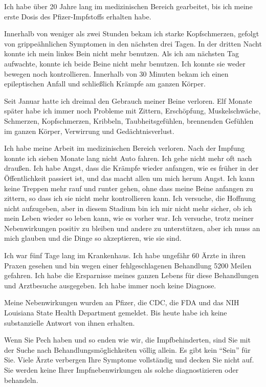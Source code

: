 Ich habe über 20 Jahre lang im medizinischen Bereich gearbeitet, bis ich meine
erste Dosis des Pfizer-Impfstoffs erhalten habe.

Innerhalb von weniger als zwei Stunden bekam ich starke Kopfschmerzen, gefolgt
von grippeähnlichen Symptomen in den nächsten drei Tagen. In der dritten Nacht
konnte ich mein linkes Bein nicht mehr benutzen. Als ich am nächsten Tag
aufwachte, konnte ich beide Beine nicht mehr benutzen. Ich konnte sie weder
bewegen noch kontrollieren. Innerhalb von 30 Minuten bekam ich einen
epileptischen Anfall und schließlich Krämpfe am ganzen Körper.

Seit Januar hatte ich dreimal den Gebrauch meiner Beine verloren. Elf Monate
später habe ich immer noch Probleme mit Zittern, Erschöpfung, Muskelschwäche,
Schmerzen, Kopfschmerzen, Kribbeln, Taubheitsgefühlen, brennenden Gefühlen im
ganzen Körper, Verwirrung und Gedächtnisverlust.

Ich habe meine Arbeit im medizinischen Bereich verloren. Nach der Impfung konnte
ich sieben Monate lang nicht Auto fahren. Ich gehe nicht mehr oft nach
draußen. Ich habe Angst, dass die Krämpfe wieder anfangen, wie es früher in der
Öffentlichkeit passiert ist, und das macht allen um mich herum Angst. Ich kann
keine Treppen mehr rauf und runter gehen, ohne dass meine Beine anfangen zu
zittern, so dass ich sie nicht mehr kontrollieren kann. Ich versuche, die
Hoffnung nicht aufzugeben, aber in diesem Stadium bin ich mir nicht mehr sicher,
ob ich mein Leben wieder so leben kann, wie es vorher war. Ich versuche, trotz
meiner Nebenwirkungen positiv zu bleiben und andere zu unterstützen, aber ich
muss an mich glauben und die Dinge so akzeptieren, wie sie sind.

Ich war fünf Tage lang im Krankenhaus. Ich habe ungefähr 60 Ärzte in ihren
Praxen gesehen und bin wegen einer fehlgeschlagenen Behandlung 5200 Meilen
gefahren. Ich habe die Ersparnisse meines ganzen Lebens für diese Behandlungen
und Arztbesuche ausgegeben. Ich habe immer noch keine Diagnose.

Meine Nebenwirkungen wurden an Pfizer, die CDC, die FDA und das NIH Louisiana
State Health Department gemeldet. Bis heute habe ich keine substanzielle Antwort
von ihnen erhalten.

Wenn Sie Pech haben und so enden wie wir, die Impfbehinderten, sind Sie mit der
Suche nach Behandlungsmöglichkeiten völlig allein. Es gibt kein ``Sein'' für
Sie. Viele Ärzte verbergen Ihre Symptome vollständig und decken Sie nicht
auf. Sie werden keine Ihrer Impfnebenwirkungen als solche diagnostizieren oder
behandeln.

